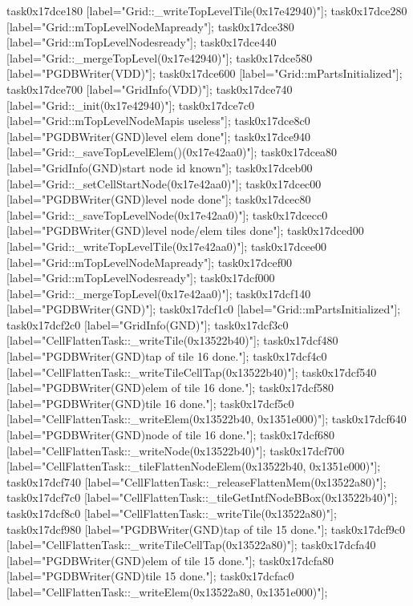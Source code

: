{	task0x17dce180 [label="Grid::_writeTopLevelTile(0x17e42940)"];
	task0x17dce280 [label="Grid::mTopLevelNodeMap\nVDD ready"];
	task0x17dce380 [label="Grid::mTopLevelNodes\nVDD ready"];
	task0x17dce440 [label="Grid::_mergeTopLevel(0x17e42940)"];
	task0x17dce580 [label="PGDBWriter(VDD)\nInitialized"];
	task0x17dce600 [label="Grid::mParts\nVDD Initialized"];
	task0x17dce700 [label="GridInfo(VDD)\nInitialized"];
	task0x17dce740 [label="Grid::_init(0x17e42940)"];
	task0x17dce7c0 [label="Grid::mTopLevelNodeMap\nGND is useless"];
	task0x17dce8c0 [label="PGDBWriter(GND)\nTop level elem done"];
	task0x17dce940 [label="Grid::_saveTopLevelElem()(0x17e42aa0)"];
	task0x17dcea80 [label="GridInfo(GND)\nCell start node id known"];
	task0x17dceb00 [label="Grid::_setCellStartNode(0x17e42aa0)"];
	task0x17dcec00 [label="PGDBWriter(GND)\nTop level node done"];
	task0x17dcec80 [label="Grid::_saveTopLevelNode(0x17e42aa0)"];
	task0x17dcecc0 [label="PGDBWriter(GND)\nTop level node/elem tiles done"];
	task0x17dced00 [label="Grid::_writeTopLevelTile(0x17e42aa0)"];
	task0x17dcee00 [label="Grid::mTopLevelNodeMap\nGND ready"];
	task0x17dcef00 [label="Grid::mTopLevelNodes\nGND ready"];
	task0x17dcf000 [label="Grid::_mergeTopLevel(0x17e42aa0)"];
	task0x17dcf140 [label="PGDBWriter(GND)\nInitialized"];
	task0x17dcf1c0 [label="Grid::mParts\nGND Initialized"];
	task0x17dcf2c0 [label="GridInfo(GND)\nInitialized"];
	task0x17dcf3c0 [label="CellFlattenTask::_writeTile(0x13522b40)"];
	task0x17dcf480 [label="PGDBWriter(GND)\nCell tap of tile 16 done."];
	task0x17dcf4c0 [label="CellFlattenTask::_writeTileCellTap(0x13522b40)"];
	task0x17dcf540 [label="PGDBWriter(GND)\nCell elem of tile 16 done."];
	task0x17dcf580 [label="PGDBWriter(GND)\nCell tile 16 done."];
	task0x17dcf5c0 [label="CellFlattenTask::_writeElem(0x13522b40, 0x1351e000)"];
	task0x17dcf640 [label="PGDBWriter(GND)\nCell node of tile 16 done."];
	task0x17dcf680 [label="CellFlattenTask::_writeNode(0x13522b40)"];
	task0x17dcf700 [label="CellFlattenTask::_tileFlattenNodeElem(0x13522b40, 0x1351e000)"];
	task0x17dcf740 [label="CellFlattenTask::_releaseFlattenMem(0x13522a80)"];
	task0x17dcf7c0 [label="CellFlattenTask::_tileGetIntfNodeBBox(0x13522b40)"];
	task0x17dcf8c0 [label="CellFlattenTask::_writeTile(0x13522a80)"];
	task0x17dcf980 [label="PGDBWriter(GND)\nCell tap of tile 15 done."];
	task0x17dcf9c0 [label="CellFlattenTask::_writeTileCellTap(0x13522a80)"];
	task0x17dcfa40 [label="PGDBWriter(GND)\nCell elem of tile 15 done."];
	task0x17dcfa80 [label="PGDBWriter(GND)\nCell tile 15 done."];
	task0x17dcfac0 [label="CellFlattenTask::_writeElem(0x13522a80, 0x1351e000)"];
}
